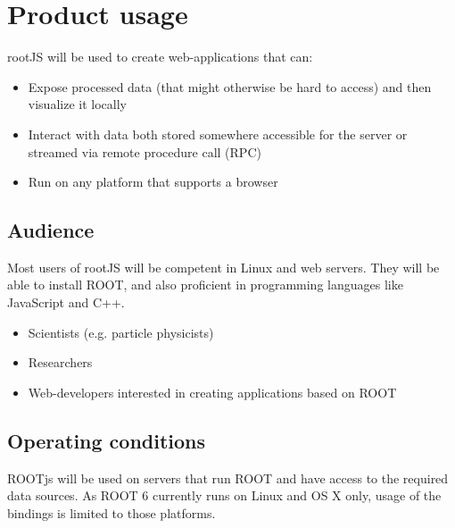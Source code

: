 \chapter{Product usage}

rootJS will be used to create web-applications that can:
\begin{itemize}
	\item Expose processed data (that might otherwise be hard to access) and then visualize it locally
	\item Interact with data both stored somewhere accessible for the server or streamed via remote procedure call (RPC)
	\item Run on any platform that supports a browser
\end{itemize}


\section{Audience}
Most users of rootJS will be competent in Linux and web servers. They will be able to install ROOT, and also proficient in programming languages like JavaScript and C++.
\begin{itemize}
	\item Scientists (e.g. particle physicists)
	\item Researchers
	\item Web-developers interested in creating applications based on ROOT
\end{itemize}

\section{Operating conditions}

ROOTjs will be used on servers that run ROOT and have access to the required data sources. As ROOT 6 currently runs on Linux and OS X only, usage of the bindings is limited to those platforms.
